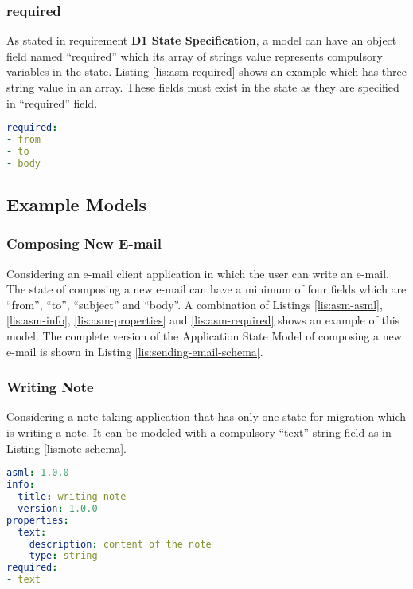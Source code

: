 \subsubsection{required}
As stated in requirement \textbf{D1 State Specification}, a model can have an object field named “required” which its array of strings value represents compulsory variables in the state.
Listing \ref{lis:asm-required} shows an example which has three string value in an array. These fields must exist in the state as they are specified in “required” field.

\lstset{
  label=lis:asm-required, caption=Application State Model “required” field example.
}
\begin{lstlisting}[language=yaml]
required:
- from
- to
- body

\end{lstlisting}

\subsection{Example Models}
\subsubsection{Composing New E-mail}
Considering an e-mail client application in which the user can write an e-mail. The state of composing a new e-mail can have a minimum of four fields which are “from”, “to”, “subject” and “body”. A combination of Listings \ref{lis:asm-asml},  \ref{lis:asm-info},  \ref{lis:asm-properties} and  \ref{lis:asm-required} shows an example of this model.
The complete version of the Application State Model of composing a new e-mail is shown in Listing \ref{lis:sending-email-schema}.
\subsubsection{Writing Note}
Considering a note-taking application that has only one state for migration which is writing a note. It can be modeled with a compulsory “text” string field as in Listing \ref{lis:note-schema}.

\lstset{
  label=lis:note-schema, caption=Note Writing example Application State Model as JSON Schema in YAML.
}
\begin{lstlisting}[language=yaml]
asml: 1.0.0
info:
  title: writing-note
  version: 1.0.0
properties:
  text:
    description: content of the note
    type: string
required:
- text

\end{lstlisting}
